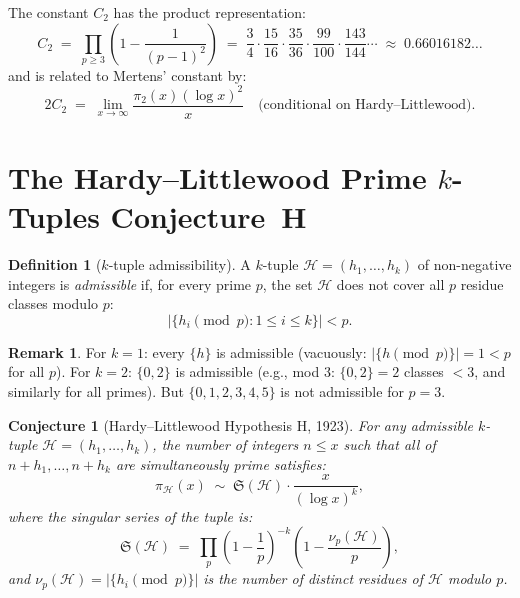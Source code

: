 \documentclass[12pt,a4paper]{amsart}
\newtheorem{conjecture}[theorem]{Conjecture}
\theoremstyle{definition}
\newtheorem{definition}[theorem]{Definition}
\newtheorem{remark}[theorem]{Remark}
\begin{document}
The constant $C_2$ has the product representation:
\[
  C_2 \;=\; \prod_{p \geq 3} \left(1 - \frac{1}{(p-1)^2}\right)
  \;=\; \frac{3}{4} \cdot \frac{15}{16} \cdot \frac{35}{36} \cdot \frac{99}{100}
       \cdot \frac{143}{144} \cdots
  \;\approx\; 0.66016182\ldots
\]
and is related to Mertens' constant by:
\[
  2 C_2 \;=\; \lim_{x \to \infty} \frac{\pi_2(x) (\log x)^2}{x}
  \quad \text{(conditional on Hardy--Littlewood)}.
\]

\section{The Hardy--Littlewood Prime $k$-Tuples Conjecture~$\mathbf{H}$}
\label{sec:ktuples}

\begin{definition}[$k$-tuple admissibility]
  A $k$-tuple $\mathcal{H} = (h_1, \ldots, h_k)$ of non-negative integers
  is \emph{admissible} if, for every prime $p$, the set $\mathcal{H}$ does
  not cover all $p$ residue classes modulo $p$:
  \[
    \bigl|\{h_i \pmod p : 1 \leq i \leq k\}\bigr| < p.
  \]
\end{definition}

\begin{remark}
  For $k = 1$: every $\{h\}$ is admissible (vacuously: $|\{h \pmod p\}| = 1 < p$
  for all $p$).  For $k = 2$: $\{0, 2\}$ is admissible (e.g., mod 3:
  $\{0, 2\} = 2$ classes $< 3$, and similarly for all primes).
  But $\{0, 1, 2, 3, 4, 5\}$ is not admissible for $p = 3$.
\end{remark}

\begin{conjecture}[Hardy--Littlewood Hypothesis H, 1923]\label{conj:H}
  For any admissible $k$-tuple $\mathcal{H} = (h_1, \ldots, h_k)$,
  the number of integers $n \leq x$ such that all of
  $n + h_1, \ldots, n + h_k$ are simultaneously prime satisfies:
  \[
    \pi_{\mathcal{H}}(x)
    \;\sim\; \mathfrak{S}(\mathcal{H}) \cdot \frac{x}{(\log x)^k},
  \]
  where the \emph{singular series of the tuple} is:
  \[
    \mathfrak{S}(\mathcal{H})
    \;=\; \prod_p \left(1 - \frac{1}{p}\right)^{-k}
              \left(1 - \frac{\nu_p(\mathcal{H})}{p}\right),
  \]
  and $\nu_p(\mathcal{H}) = |\{h_i \pmod p\}|$ is the number of
  distinct residues of $\mathcal{H}$ modulo $p$.
\end{conjecture}
\end{document}

